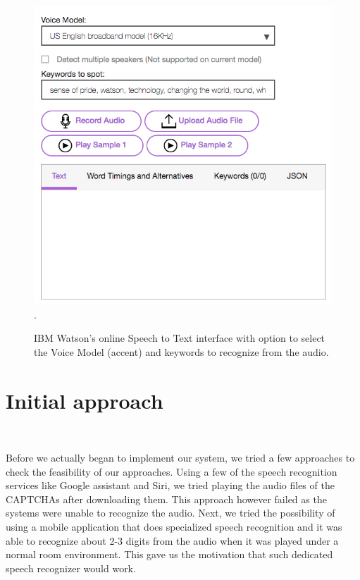 \begin{figure}[t]
   \centering
   \includegraphics[width=\columnwidth]{figures/ibmwatson.jpg}.
   \caption{IBM Watson's online Speech to Text interface with option to select the Voice Model (accent) and keywords to recognize from the audio. }
   \label{fig:speechrecognizers}
\end{figure}

\section{Initial approach} \mbox{} \
\label{sec:approach}

Before we actually began to implement our system, we tried a few approaches to check the feasibility of our approaches. Using a few of the speech recognition services like Google assistant and Siri, we tried playing the audio files of the CAPTCHAs after downloading them. This approach however failed as the systems were unable to recognize the audio. Next, we tried the possibility of using a mobile application that does specialized speech recognition and it was able to recognize about 2-3 digits from the audio when it was played under a normal room environment. This gave us the motivation that such dedicated speech recognizer would work.\newline

